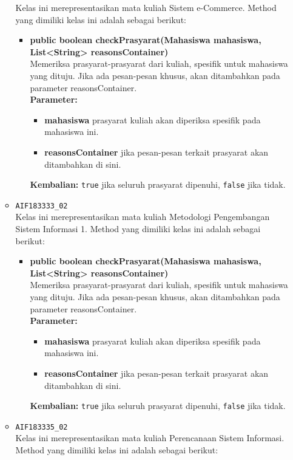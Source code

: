 \begin{enumerate}
\begin{itemize}
		Kelas ini merepresentasikan mata kuliah Sistem e-Commerce. Method yang dimiliki kelas ini adalah sebagai berikut: 
		\begin{itemize}
			\item \textbf{public boolean checkPrasyarat(Mahasiswa mahasiswa, List<String> reasonsContainer)}\\
			Memeriksa prasyarat-prasyarat dari kuliah, spesifik untuk mahasiswa yang dituju. Jika ada pesan-pesan khusus, akan ditambahkan pada parameter reasonsContainer.\\
			\textbf{Parameter:}
			\begin{itemize}
				\item \textbf{mahasiswa} prasyarat kuliah akan diperiksa spesifik pada mahasiswa ini.
				\item \textbf{reasonsContainer} jika pesan-pesan terkait prasyarat akan ditambahkan di sini.
			\end{itemize}
			\textbf{Kembalian:} \texttt{true} jika seluruh prasyarat dipenuhi, \texttt{false} jika tidak.
		\end{itemize}
		\item \texttt{AIF183333\_02} \\
		Kelas ini merepresentasikan mata kuliah Metodologi Pengembangan Sistem Informasi 1. Method yang dimiliki kelas ini adalah sebagai berikut: 
		\begin{itemize}
			\item \textbf{public boolean checkPrasyarat(Mahasiswa mahasiswa, List<String> reasonsContainer)}\\
			Memeriksa prasyarat-prasyarat dari kuliah, spesifik untuk mahasiswa yang dituju. Jika ada pesan-pesan khusus, akan ditambahkan pada parameter reasonsContainer.\\
			\textbf{Parameter:}
			\begin{itemize}
				\item \textbf{mahasiswa} prasyarat kuliah akan diperiksa spesifik pada mahasiswa ini.
				\item \textbf{reasonsContainer} jika pesan-pesan terkait prasyarat akan ditambahkan di sini.
			\end{itemize}
			\textbf{Kembalian:} \texttt{true} jika seluruh prasyarat dipenuhi, \texttt{false} jika tidak.
		\end{itemize}
		\item \texttt{AIF183335\_02} \\
		Kelas ini merepresentasikan mata kuliah Perencanaan Sistem Informasi. Method yang dimiliki kelas ini adalah sebagai berikut: 

\end{itemize}
\end{enumerate}
